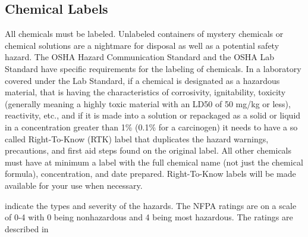 \documentclass[letterpaper,10pt,english]{sphinxmanual}
\begin{document}
\subsection{Chemical Labels}
\label{\detokenize{Laboratory_Safety/Laboratory_Safety:chemical-labels}}
All chemicals must be labeled. Unlabeled containers of mystery chemicals or chemical solutions are a nightmare for disposal as well as a potential safety hazard. The OSHA Hazard Communication Standard and the OSHA Lab Standard have specific requirements for the labeling of chemicals. In a laboratory covered under the Lab Standard, if a chemical is designated as a hazardous material, that is having the characteristics of corrosivity, ignitability, toxicity (generally meaning a highly toxic material with an LD50 of 50 mg/kg or less), reactivity, etc., and if it is made into a solution or repackaged as a solid or liquid in a concentration greater than 1\% (0.1\% for a carcinogen) it needs to have a so called Right-To-Know (RTK) label that duplicates the hazard warnings, precautions, and first aid steps found on the original label. All other chemicals must have at minimum a label with the full chemical name (not just the chemical formula), concentration, and date prepared. Right-To-Know labels will be made available for your use when necessary.

 indicate the types and severity of the hazards. The NFPA ratings are on a scale of 0-4 with 0 being nonhazardous and 4 being most hazardous. The ratings are described in
\end{document}
